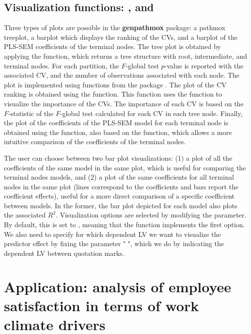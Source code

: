 \subsection{Visualization functions: ,  and  }

Three types of plots are possible in the  \textbf{genpathmox}  package: a pathmox treeplot, a barplot which displays the ranking of the CVs, and a barplot of the PLS-SEM coefficients of the terminal nodes. The tree plot is obtained by applying the  function, which returns a tree structure with root, intermediate, and terminal nodes. For each partition, the $F$-global test $p$-value is reported with the associated CV, and the number of observations associated with each node. The plot is implemented using functions from the  package \citep{diagram}. The plot of the CV ranking is obtained using the   function. This function uses the   function to visualize the importance of the CVs. The importance of  each CV is based on the $F$-statistic of the $F$-global test calculated for each CV in each tree node. Finally, the plot of the coefficients of the PLS-SEM model for each terminal node is obtained using the   function, also based on the   function, which allows a more intuitive comparison of the coefficients of the terminal nodes. 

The user can choose between two bar plot visualizations: (1) a plot of all the coefficients of the same model in the same plot, which is useful for comparing the terminal nodes models, and (2) a plot of the same coefficients for all terminal nodes in the same plot (lines correspond to the coefficients and bars report the coefficient effects), useful for a more direct comparison of a specific coefficient between models. In the former, the bar plot depicted for each model also plots the associated $R^2$. Visualization options are selected by modifying the   parameter. By default, this is set to  , meaning that the function implements the first option. We also need to specify for which dependent LV we want to visualize the predictor effect by fixing the parameter  " ", which we do by indicating the dependent LV between quotation marks.

\section{ Application: analysis of employee satisfaction in terms of work climate drivers}

